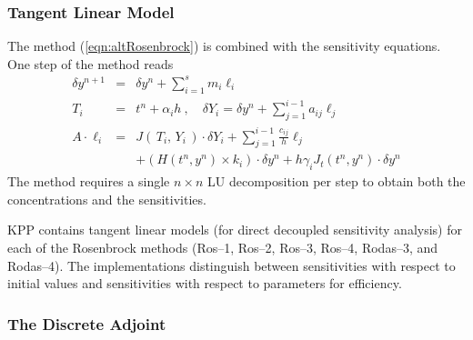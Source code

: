 \documentclass[twoside]{article}
\begin{document}
\subsubsection{Tangent Linear Model}

The method (\ref{eqn:altRosenbrock}) is combined with the sensitivity
equations. One step of the method reads
%
\begin{eqnarray}
\label{eqn:altRosenbrock-sen}
\delta y^{n+1} &=& \delta y^n + \sum_{i=1}^s m_i \ell_i\\
\nonumber
T_i &=& t^n + \alpha_i h~, %
\quad \delta Y_i = \delta y^n + \sum_{j=1}^{i-1} a_{ij} \ell_j\\
\nonumber
A \cdot \ell_i &=&
        J\left( \, T_i,\, Y_i \,\right)
              \cdot \delta Y_i
              + \sum_{j=1}^{i-1} \frac{c_{ij}}{h} \ell_j\\
\nonumber
&& +
\left( H( t^n, y^n )\times  k_i \right) \cdot \delta y^n
   + h \gamma_i J_t\left(t^n,y^n\right) \cdot \delta y^n
\end{eqnarray}
%
The method requires a single $n \times n$ LU decomposition
per step to obtain both the concentrations and the sensitivities.

KPP contains tangent linear models (for direct decoupled sensitivity
analysis) for each of the Rosenbrock methods (Ros--1, Ros--2, Ros--3,
Ros--4, Rodas--3, and Rodas--4). The implementations distinguish between
sensitivities with respect to initial values and sensitivities with
respect to parameters for efficiency.

\subsubsection{The Discrete Adjoint}
\end{document}

